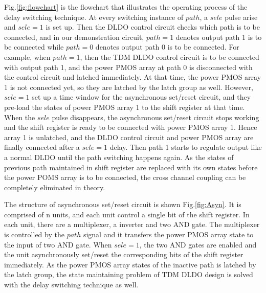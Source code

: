 \documentclass[journal]{IEEEtran}
\begin{document}
Fig.\ref{fig:flowchart} is the flowchart that illustrates the operating process of the delay switching technique. At every switching instance of $path$, a $sele$ pulse arise and $sele=1$ is set up. Then the DLDO control circuit checks which path is to be connected, and in our demonstration circuit, $path=1$ denotes output path 1 is to be connected while $path=0$ denotes output path 0 is to be connected. For example, when $path=1$, then the TDM DLDO control circuit is to be connected with output path 1, and the power PMOS array at path 0 is disconnected with the control circuit and latched immediately. At that time, the power PMOS array 1 is not connected yet, so they are latched by the latch group as well. However, $sele=1$ set up a time window for the asynchronous set/reset circuit, and they pre-load the states of power PMOS array 1 to the shift register at that time. When the $sele$ pulse disappears, the asynchronous set/reset circuit stops working and the shift register is ready to be connected with power PMOS array 1. Hence array 1 is unlatched, and the DLDO control circuit and power PMOS array are finally connected after a $sele=1$ delay. Then path 1 starts to regulate output like a normal DLDO until the path switching happens again. As the states of previous path maintained in shift register are replaced with its own states before the power POMS array is to be connected, the cross channel coupling can be completely eliminated in theory.

The structure of asynchronous set/reset circuit is shown Fig.\ref{fig:Asyn}. It is comprised of n units, and each unit control a single bit of the shift register. In each unit, there are a multiplexer, a inverter and two AND gate. The multiplexer is controlled by the $path$ signal and it transfers the power PMOS array state to the input of two AND gate. When $sele=1$, the two AND gates are enabled and the unit asynchronously set/reset the corresponding bits of the shift register immediately. As the power PMOS array states of the inactive path is latched by the latch group, the state maintaining problem of TDM DLDO design is solved with the delay switching technique as well.
\end{document}
